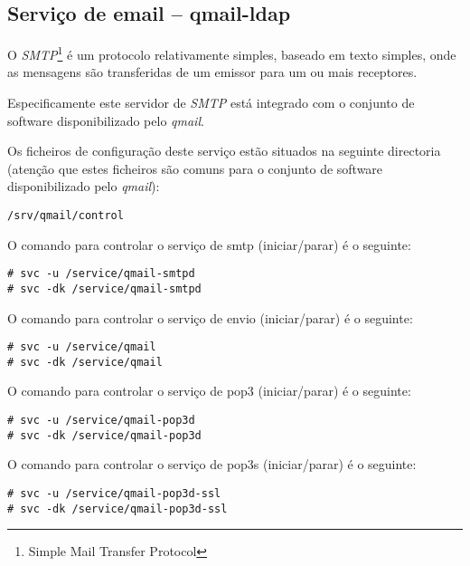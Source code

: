 \subsection{Serviço de email -- qmail-ldap}

O \emph{SMTP}\footnote{Simple Mail Transfer Protocol} é um protocolo relativamente
simples, baseado em texto simples, onde as mensagens são transferidas de um emissor
para um ou mais receptores.

Especificamente este servidor de \emph{SMTP} está integrado com o conjunto de software
disponibilizado pelo \emph{qmail}.

Os ficheiros de configuração deste serviço estão situados na seguinte directoria
(atenção que estes ficheiros são comuns para o conjunto de software disponibilizado pelo
\emph{qmail}):

\begin{Verbatim}[commandchars=\\\{\}]
/srv/qmail/control
\end{Verbatim}

O comando para controlar o serviço de smtp (iniciar/parar) é o seguinte:

\begin{Verbatim}[commandchars=\\\{\}]
# svc -u /service/qmail-smtpd
# svc -dk /service/qmail-smtpd
\end{Verbatim}

O comando para controlar o serviço de envio (iniciar/parar) é o seguinte:

\begin{Verbatim}[commandchars=\\\{\}]
# svc -u /service/qmail
# svc -dk /service/qmail
\end{Verbatim}

O comando para controlar o serviço de pop3 (iniciar/parar) é o seguinte:

\begin{Verbatim}[commandchars=\\\{\}]
# svc -u /service/qmail-pop3d
# svc -dk /service/qmail-pop3d
\end{Verbatim}

O comando para controlar o serviço de pop3s (iniciar/parar) é o seguinte:

\begin{Verbatim}[commandchars=\\\{\}]
# svc -u /service/qmail-pop3d-ssl
# svc -dk /service/qmail-pop3d-ssl
\end{Verbatim}

